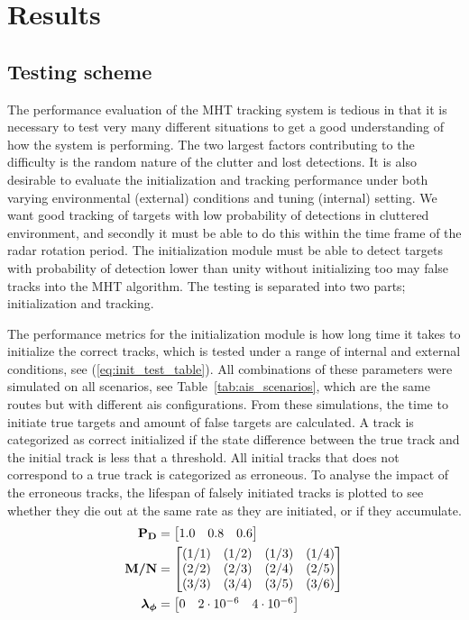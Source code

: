 \chapter{Results}\label{chapter:results}
\section{Testing scheme}
The performance evaluation of the MHT tracking system is tedious in that it is necessary to test very many different situations to get a good understanding of how the system is performing. The two largest factors contributing to the difficulty is the random nature of the clutter and lost detections. It is also desirable to evaluate the initialization and tracking performance under both varying environmental (external) conditions and tuning (internal) setting. We want good tracking of targets with low probability of detections in cluttered environment, and secondly it must be able to do this within the time frame of the radar rotation period. The initialization module must be able to detect targets with probability of detection lower than unity without initializing too may false tracks into the MHT algorithm. The testing is separated into two parts; initialization and tracking.

The performance metrics for the initialization module is how long time it takes to initialize the correct tracks, which is tested under a range of internal and external conditions, see (\ref{eq:init_test_table}). All combinations of these parameters were simulated on all scenarios, see Table~\ref{tab:ais_scenarios}, which are the same routes but with different \gls{ais} configurations. From these simulations, the time to initiate true targets and amount of false targets are calculated. A track is categorized as correct initialized if the state difference between the true track and the initial track is less that a threshold. All initial tracks that does not correspond to a true track is categorized as erroneous. To analyse the impact of the erroneous tracks, the lifespan of falsely initiated tracks is plotted to see whether they die out at the same rate as they are initiated, or if they accumulate.  
\begin{equation}\label{eq:init_test_table}
\begin{split}
\boldsymbol{\mathbf{P_D}} &= \begin{bmatrix} 1.0 & 0.8 & 0.6 \end{bmatrix} \\
\boldsymbol{\mathbf{M/N}} &= \begin{bmatrix} 	(1/1) & (1/2) & (1/3) & (1/4) \\
							(2/2) & (2/3) & (2/4) & (2/5) \\
							(3/3) & (3/4) & (3/5) & (3/6)
		   \end{bmatrix} \\
\boldsymbol{\mathbf{\lambda_\phi}} &= \begin{bmatrix} 0 & 2\cdot10^{-6} & 4\cdot10^{-6} \end{bmatrix}
\end{split}
\end{equation}

